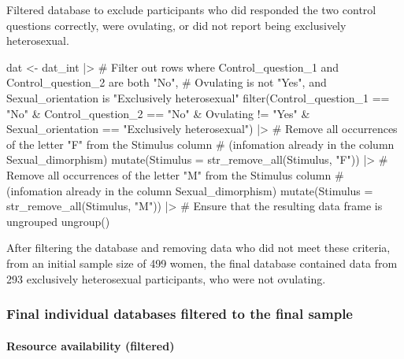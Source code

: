 \documentclass[
  bookmarksnumbered]{article}
\newenvironment{Shaded}{\begin{snugshade}}{\end{snugshade}}
\newcommand{\AttributeTok}[1]{\textcolor[rgb]{0.80,0.80,0.80}{#1}}
\newcommand{\CommentTok}[1]{\textcolor[rgb]{0.50,0.62,0.50}{#1}}
\newcommand{\FunctionTok}[1]{\textcolor[rgb]{0.94,0.94,0.56}{#1}}
\newcommand{\NormalTok}[1]{\textcolor[rgb]{0.80,0.80,0.80}{#1}}
\newcommand{\OtherTok}[1]{\textcolor[rgb]{0.94,0.94,0.56}{#1}}
\newcommand{\SpecialCharTok}[1]{\textcolor[rgb]{0.86,0.64,0.64}{#1}}
\newcommand{\StringTok}[1]{\textcolor[rgb]{0.80,0.58,0.58}{#1}}
\begin{document}
Filtered database to exclude participants who did responded the two control questions correctly, were ovulating, or did not report being exclusively heterosexual.

\begin{Shaded}
\begin{Highlighting}[]
\NormalTok{dat }\OtherTok{\textless{}{-}}\NormalTok{ dat\_int }\SpecialCharTok{|\textgreater{}}
  \CommentTok{\# Filter out rows where Control\_question\_1 and Control\_question\_2 are both "No",}
  \CommentTok{\# Ovulating is not "Yes", and Sexual\_orientation is "Exclusively heterosexual"}
  \FunctionTok{filter}\NormalTok{(Control\_question\_1 }\SpecialCharTok{==} \StringTok{"No"} \SpecialCharTok{\&}
\NormalTok{    Control\_question\_2 }\SpecialCharTok{==} \StringTok{"No"} \SpecialCharTok{\&}
\NormalTok{    Ovulating }\SpecialCharTok{!=} \StringTok{"Yes"} \SpecialCharTok{\&}
\NormalTok{    Sexual\_orientation }\SpecialCharTok{==} \StringTok{"Exclusively heterosexual"}\NormalTok{) }\SpecialCharTok{|\textgreater{}}
  \CommentTok{\# Remove all occurrences of the letter "F" from the Stimulus column}
  \CommentTok{\# (infomation already in the column Sexual\_dimorphism)}
  \FunctionTok{mutate}\NormalTok{(}\AttributeTok{Stimulus =} \FunctionTok{str\_remove\_all}\NormalTok{(Stimulus, }\StringTok{"F"}\NormalTok{)) }\SpecialCharTok{|\textgreater{}}
  \CommentTok{\# Remove all occurrences of the letter "M" from the Stimulus column}
  \CommentTok{\# (infomation already in the column Sexual\_dimorphism)}
  \FunctionTok{mutate}\NormalTok{(}\AttributeTok{Stimulus =} \FunctionTok{str\_remove\_all}\NormalTok{(Stimulus, }\StringTok{"M"}\NormalTok{)) }\SpecialCharTok{|\textgreater{}}
  \CommentTok{\# Ensure that the resulting data frame is ungrouped}
  \FunctionTok{ungroup}\NormalTok{()}
\end{Highlighting}
\end{Shaded}

After filtering the database and removing data who did not meet these criteria, from an initial sample size of 499 women, the final database contained data from 293 exclusively heterosexual participants, who were not ovulating.

\subsubsection{Final individual databases filtered to the final sample}\label{final-individual-databases-filtered-to-the-final-sample}

\paragraph{Resource availability (filtered)}\label{resource-availability-filtered}
\end{document}
